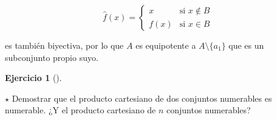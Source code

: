 \documentclass[
  a4paper,
]{scrreport}
\theoremstyle{definition}
\newtheorem{exercise}{Ejercicio}[chapter]
\theoremstyle{remark}
\begin{document}
\begin{tcolorbox}
\begin{tcolorbox}
\begin{tcolorbox}
\begin{tcolorbox}
\begin{tcolorbox}
\begin{tcolorbox}
\begin{tcolorbox}
\begin{tcolorbox}
\begin{tcolorbox}
\begin{tcolorbox}
\begin{tcolorbox}
\begin{tcolorbox}
\begin{tcolorbox}
\begin{tcolorbox}
\begin{tcolorbox}
\begin{tcolorbox}
\begin{tcolorbox}
\begin{tcolorbox}
\begin{tcolorbox}
\begin{tcolorbox}
\begin{tcolorbox}
\begin{tcolorbox}
\begin{tcolorbox}
\begin{tcolorbox}
\begin{tcolorbox}
\begin{tcolorbox}
\begin{tcolorbox}
\begin{tcolorbox}
\begin{tcolorbox}
\begin{tcolorbox}
\begin{tcolorbox}
\begin{tcolorbox}
\begin{tcolorbox}
\[
\hat f(x)=
\begin{cases}
x & \mbox{si } x\not\in B\\
f(x) & \mbox{si } x\in B
\end{cases}
\]

es también biyectiva, por lo que \(A\) es equipotente a
\(A\setminus \{a_1\}\) que es un subconjunto propio suyo.

\end{tcolorbox}

\begin{exercise}[]\protect\hypertarget{exr-producto-cartesiano-numerable}{}\label{exr-producto-cartesiano-numerable}

\(\star\) Demostrar que el producto cartesiano de dos conjuntos
numerables es numerable. ¿Y el producto cartesiano de \(n\) conjuntos
numerables?

\end{exercise}


\end{tcolorbox}
\end{tcolorbox}
\end{tcolorbox}
\end{tcolorbox}
\end{tcolorbox}
\end{tcolorbox}
\end{tcolorbox}
\end{tcolorbox}
\end{tcolorbox}
\end{tcolorbox}
\end{tcolorbox}
\end{tcolorbox}
\end{tcolorbox}
\end{tcolorbox}
\end{tcolorbox}
\end{tcolorbox}
\end{tcolorbox}
\end{tcolorbox}
\end{tcolorbox}
\end{tcolorbox}
\end{tcolorbox}
\end{tcolorbox}
\end{tcolorbox}
\end{tcolorbox}
\end{tcolorbox}
\end{tcolorbox}
\end{tcolorbox}
\end{tcolorbox}
\end{tcolorbox}
\end{tcolorbox}
\end{tcolorbox}
\end{tcolorbox}
\end{document}
